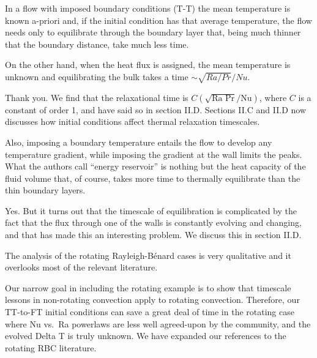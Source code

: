 \documentclass[aps, 11pt, singlecolumn]{revtex4-1} %
\begin{document}
\begin{singlespace}
\begin{myquotation}
In a flow with imposed boundary conditions (T-T) the mean temperature is known a-priori and, if the initial condition has that average temperature, the flow needs only to equilibrate through the boundary layer that, being much thinner that the boundary distance, take much less time.

On the other hand, when the heat flux is assigned, the mean temperature is unknown and equilibrating the bulk takes a time $\sim\sqrt{Ra/Pr}/Nu$. 
\end{myquotation}
Thank you.
We find that the relaxational time is $C (\sqrt{\text{Ra Pr}}/\text{Nu})$, where $C$ is a constant of order 1, and have said so in section II.D.
Sections II.C and II.D now discusses how initial conditions affect thermal relaxation timescales.

\begin{myquotation}
Also, imposing a boundary temperature entails the flow to develop any temperature gradient, while imposing the gradient at the wall limits the peaks. 
What the authors call ``energy reservoir'' is nothing but the heat capacity of the fluid volume that, of course, takes more time to thermally equilibrate than the thin boundary layers.
\end{myquotation}
Yes.
But it turns out that the timescale of equilibration is complicated by the fact that the flux through one of the walls is constantly evolving and changing, and that has made this an interesting problem.
We discuss this in section II.D.

\begin{myquotation}
The analysis of the rotating Rayleigh-B\'{e}nard cases is very qualitative and it overlooks most of the relevant literature.
\end{myquotation}
Our narrow goal in including the rotating example is to show that timescale lessons in non-rotating convection apply to rotating convection.
Therefore, our TT-to-FT initial conditions can save a great deal of time in the rotating case where Nu vs.~Ra powerlaws are less well agreed-upon by the community, and the evolved Delta T is truly unknown.
We have expanded our references to the rotating RBC literature.


\end{singlespace}
\end{document}
